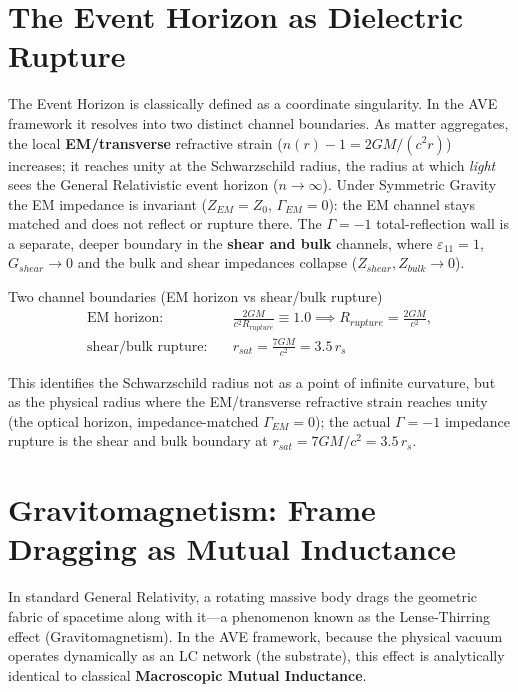 \section{The Event Horizon as Dielectric Rupture}
\label{sec:dielectric_rupture}

The Event Horizon is classically defined as a coordinate singularity. In the AVE framework it resolves into two distinct channel boundaries. As matter aggregates, the local \textbf{EM/transverse} refractive strain ($n(r)-1 = 2GM/(c^2 r)$) increases; it reaches unity at the Schwarzschild radius, the radius at which \emph{light} sees the General Relativistic event horizon ($n \to \infty$). Under Symmetric Gravity the EM impedance is invariant ($Z_{EM}=Z_0$, $\Gamma_{EM}=0$): the EM channel stays matched and does not reflect or rupture there. The $\Gamma=-1$\gammaundeclared{} total-reflection wall is a separate, deeper boundary in the \textbf{shear and bulk} channels, where $\varepsilon_{11}=1$, $G_{shear}\to0$ and the bulk and shear impedances collapse ($Z_{shear},Z_{bulk}\to0$).
\begin{resultbox}{Two channel boundaries (EM horizon vs shear/bulk rupture)}
\begin{equation}
\begin{aligned}
    \text{EM horizon:} &\quad \frac{2GM}{c^2 R_{rupture}} \equiv 1.0 \implies R_{rupture} = \frac{2GM}{c^2}, \\
    \text{shear/bulk rupture:} &\quad r_{sat} = \frac{7GM}{c^2} = 3.5\,r_s
\end{aligned}
\end{equation}
\end{resultbox}
This identifies the Schwarzschild radius not as a point of infinite curvature, but as the physical radius where the EM/transverse refractive strain reaches unity (the optical horizon, impedance-matched $\Gamma_{EM}=0$); the actual $\Gamma=-1$\gammaundeclared{} impedance rupture is the shear and bulk boundary at $r_{sat}=7GM/c^2=3.5\,r_s$.

\section{Gravitomagnetism: Frame Dragging as Mutual Inductance}
\label{sec:gravitomagnetism_viscosity}
In standard General Relativity, a rotating massive body drags the geometric fabric of spacetime along with it—a phenomenon known as the Lense-Thirring effect (Gravitomagnetism). In the AVE framework, because the physical vacuum operates dynamically as an LC network (the substrate), this effect is analytically identical to classical \textbf{Macroscopic Mutual Inductance}.


